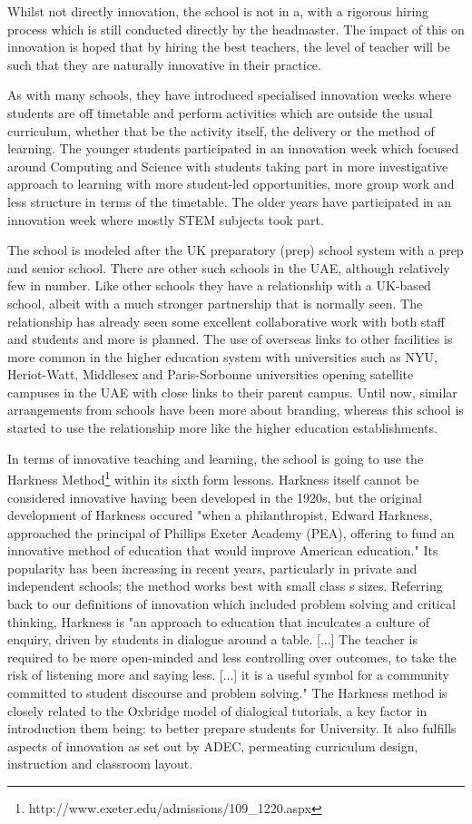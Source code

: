 Whilst not directly innovation, the school is not in a, with a rigorous hiring process which is still conducted directly by the headmaster. The impact of this on innovation is hoped that by hiring the best teachers, the level of teacher will be such that they are naturally innovative in their practice.

As with many schools, they have introduced specialised innovation weeks where students are off timetable and perform activities which are outside the usual curriculum, whether that be the activity itself, the delivery or the method of learning. The younger students participated in an innovation week which focused around Computing and Science with students taking part in more investigative approach to learning with more student-led opportunities, more group work and less structure in terms of the timetable. The older years have participated in an innovation week where mostly STEM subjects took part.

The school is modeled after the UK preparatory (prep) school system with a prep and senior school. There are other such schools in the UAE, although relatively few in number. Like other schools they have a relationship with a UK-based school, albeit with a much stronger partnership that is normally seen. The relationship has already seen some excellent collaborative work with both staff and students and  more is planned. The use of overseas links to other facilities is more common in the higher education system with universities such as NYU, Heriot-Watt, Middlesex and Paris-Sorbonne universities opening satellite campuses in the UAE with close links to their parent campus. Until now, similar arrangements from schools have been more about branding, whereas this school is started to use the relationship more like the higher education establishments.

In terms of innovative teaching and learning, the school is going to use the Harkness Method\footnote{http://www.exeter.edu/admissions/109\_1220.aspx} within its sixth form lessons. Harkness itself cannot be considered innovative having been developed in the 1920s, but the original development of Harkness occured "when a philanthropist, Edward Harkness, approached the principal of Phillips Exeter Academy (PEA), offering to fund an innovative method of education that would improve American education." \cite{Sevigny2016} Its popularity has been increasing in recent years, particularly in private and independent schools; the method works best with small class s sizes. Referring back to our definitions of innovation which included problem solving and critical thinking, Harkness is "an approach to education that inculcates a culture of enquiry, driven by students in dialogue around a table. [...] The teacher is required to be more open-minded and less controlling over outcomes, to take the risk of listening more and saying less. [...] it is a useful symbol for a community committed to student discourse and problem solving." \cite{Williams2010} The Harkness method is closely related to the Oxbridge model of dialogical tutorials, a key factor in introduction them being: to better prepare students for University. It also fulfills aspects of innovation as set out by ADEC, permeating curriculum design, instruction and classroom layout. 

